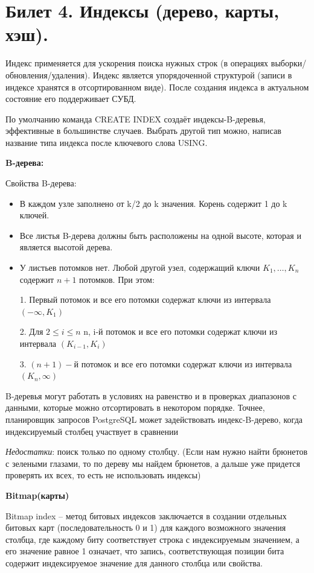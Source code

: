 \newpage
\section {Билет 4. Индексы (дерево, карты, хэш).}

Индекс применяется для ускорения поиска нужных строк (в операциях
выборки/обновления/удаления). Индекс является упорядоченной структурой (записи в индексе хранятся в отсортированном виде). После создания индекса в актуальном состояние его поддерживает СУБД.

По умолчанию команда CREATE INDEX создаёт индексы-B-деревья, эффективные в большинстве случаев. Выбрать другой тип можно, написав название типа индекса после ключевого слова USING. 

\textbf{B-дерева:} 

Свойства B-дерева: 
\begin{itemize}
	\item В каждом узле заполнено от k/2 до k значения. Корень содержит 1 до k ключей.
	\item Все листья B-дерева должны быть расположены на одной высоте, которая и является высотой дерева.
	\item У листьев потомков нет. Любой другой узел, содержащий ключи $K_{1}, …,  K_{n}$ содержит $n+1$ потомков. При этом:
	
	1. Первый потомок и все его потомки содержат ключи из интервала  $(-\infty ,K_{1})$
	
	2. Для $ 2\leq i\leq n$ n, i-й потомок и все его потомки содержат ключи из интервала $ (K_{i-1},K_{i})$ 
	
	3. $(n+1)-$й потомок и все его потомки содержат ключи из интервала $(K_{n},\infty )$
\end{itemize}


B-деревья могут работать в условиях на равенство и в проверках диапазонов с данными, которые можно отсортировать в некотором порядке. Точнее, планировщик запросов PostgreSQL может задействовать индекс-B-дерево, когда индексируемый столбец участвует в сравнении 

\textit{Недостатки}: поиск только по одному столбцу. (Если нам нужно найти брюнетов с зелеными глазами, то по дереву мы найдем брюнетов, а дальше уже придется проверять их всех, то есть не использовать индексы)

\textbf{Bitmap(карты)} 

Bitmap index – метод битовых индексов заключается в создании отдельных битовых карт (последовательность 0 и 1) для каждого возможного значения столбца, где каждому биту соответствует строка с индексируемым значением, а его значение равное 1 означает, что запись, соответствующая позиции бита содержит индексируемое значение для данного столбца или свойства.

